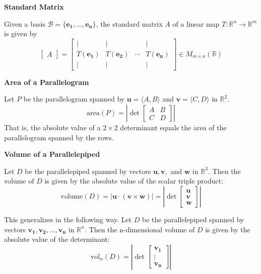 \documentclass{article}
\newcommand{\R}{\mathbb{R}}
\newenvironment{definition}[1]{
    \par\noindent\textbf{#1}\par\noindent
}{
    \par \vspace{0.5cm}
}
\begin{document}
\begin{definition}{Standard Matrix}
    Given a basis \( \mathcal{B} = \{ \bm{e_1}, \ldots, \bm{e_n} \} \), the standard matrix \( A \) of a linear map \( T: \R^n \to \R^m \) is given by 
    \[ \begin{bmatrix} A \end{bmatrix} = \begin{bmatrix}
    | & | & & | \\
    T(\bm{e_1}) & T(\bm{e_2}) & \cdots & T(\bm{e_n}) \\
    | & | & & |
    \end{bmatrix} \in M_{m \times n} (\R) \]
\end{definition}

\begin{definition}{Area of a Parallelogram}
    Let \( P \) be the parallelogram spanned by \( \bm{u} = \langle A, B \rangle \) and \( \bm{v} = \langle C, D \rangle \) in \( \R^2 \). 
    \[ \text{area}(P) = \left| \det\begin{bmatrix} A & B \\ C & D \end{bmatrix} \right| \]
    That is, the absolute value of a \( 2 \times 2 \) determinant equals the area of the parallelogram spanned by the rows.
\end{definition}

\begin{definition}{Volume of a Parallelepiped}
    Let \( D \) be the parallelepiped spanned by vectors \( \bm{u}, \bm{v}, \) and \( \bm{w} \) in \( \R^3 \). Then the volume of \( D \) is given by the absolute value of the scalar triple product:
    \[ \text{volume}(D) = |\bm{u} \cdot (\bm{v} \times \bm{w})| = \left| \det\begin{bmatrix} \bm{u} \\ \bm{v} \\ \bm{w} \end{bmatrix} \right| \]

    This generalizes in the following way. Let \( D \) be the parallelepiped spanned by vectors \( \bm{v_1}, \bm{v_2}, \ldots, \bm{v_n} \) in \( \R^n \). Then the n-dimensional volume of \( D \) is given by the absolute value of the determinant:
    \[ \text{vol}_n(D) = \left| \det\begin{bmatrix} \bm{v_1} \\ \vdots \\ \bm{v_n} \end{bmatrix} \right| \]
\end{definition}
\end{document}
